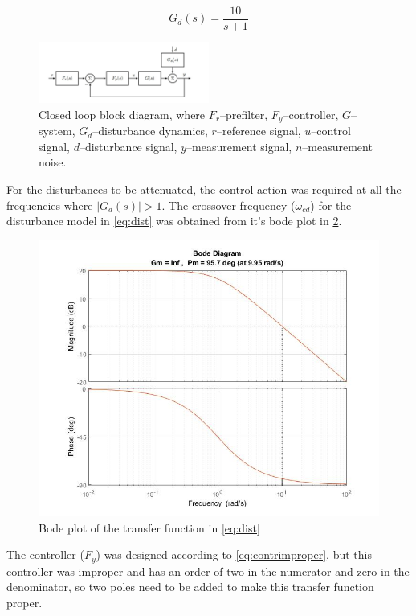 \documentclass[a4paper]{article}
\begin{document}
\begin{equation}
G_d(s) = \frac{10}{s+1}
\label{eq:dist}
\end{equation}

\begin{figure}[H]
	\begin{center}
		\includegraphics[width=0.5\textwidth]{system_dist}
	\end{center}
	\caption{Closed loop block diagram, where $F_r$--prefilter, $F_y$--controller, $G$--system, $G_d$--disturbance dynamics, $r$--reference signal, $u$--control signal, $d$--disturbance signal, $y$--measurement signal, $n$--measurement noise.}
	\label{fig:block_dist}
\end{figure}

For the disturbances to be attenuated, the control action was required at all the frequencies where $\lvert G_d(s)\lvert >1$. The crossover frequency ($\omega_{cd}$) for the disturbance model in \cref{eq:dist} was obtained from it's bode plot in \cref{fig:bode_gd}.

\begin{figure}[!ht]
\centering
\includegraphics[width=.8\linewidth]{bode_gd}
\caption{Bode plot of the transfer function in \cref{eq:dist}}
\label{fig:bode_gd}
\end{figure}

The controller ($F_y$) was designed according to \cref{eq:contrimproper}, but this controller was improper and has an order of two in the numerator and zero in the denominator, so two poles need to be added to make this transfer function proper. 
\end{document}
